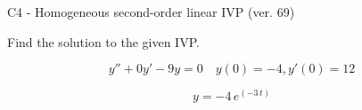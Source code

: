 \begin{exercise}
  \begin{exerciseTitle}C4 - Homogeneous second-order linear IVP (ver. 69)\end{exerciseTitle}
  \begin{exerciseStatement}
    
Find the solution to the given IVP.

    
\[y''+0y'-9y = 0 \hspace{1em} y(0) = -4 , y'(0) = 12\]

  \end{exerciseStatement}
  \begin{exerciseAnswer}
    
\[y= -4 \, e^{\left(-3 \, t\right)}\]

  \end{exerciseAnswer}
\end{exercise}